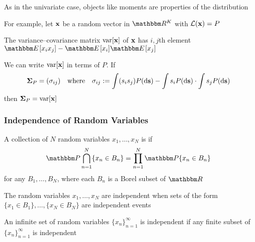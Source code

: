 \begin{frame}
    
    \vspace{2em}
    As in the univariate case, objects like moments are properties
    of the distribution

    \vspace{1em}
    For example, let ${\mathbf x}$ be a random vector in $\RR^K$
    with $\mathcal L({\mathbf x}) = P$
    
    The variance--covariance matrix $\operatorname{var} [{\mathbf x}]$ of
    ${\mathbf x}$ has $i,j$th element $\EE [x_i x_j] - \EE[x_i]\EE[x_j]$
    
    We can
    write $\operatorname{var} [{\mathbf x}]$ in terms of $P$. If
    \begin{equation*}
        \label{eq:vcd2}
        {\boldsymbol \Sigma}_P = (\sigma_{ij}) 
        \quad \text{where} \quad
        \sigma_{ij} := \int (s_i s_j) P(\mathop{}\!\mathrm{d} {\mathbf s}) 
            - \int s_i P(\mathop{}\!\mathrm{d} {\mathbf s}) \cdot \int s_j P(\mathop{}\!\mathrm{d} {\mathbf s})
    \end{equation*}
    then ${\boldsymbol \Sigma}_P = \operatorname{var}[{\mathbf x}]$
    
\end{frame}

\begin{frame}\frametitle{Independence of Random Variables}

    \vspace{2em}
    A collection of $N$ random variables $x_1, \ldots, x_N$ is  if
    \begin{equation}
        \label{eq:bcap}
        \PP \bigcap_{n=1}^N \{x_n \in B_n\}
        = \prod_{n=1}^N \PP\{x_n \in B_n\} 
    \end{equation}
    for any $B_1, \ldots, B_N$, where each $B_n$ is a Borel subset of $\RR$
    
    \vspace{1em}
    The random variables $x_1, \ldots, x_N$ are
    independent when sets of the form $\{x_1 \in B_1\}, \ldots, \{x_N
    \in B_N\}$ are independent events
    
    An infinite set of random variables $\{x_n\}_{n=1}^{\infty}$ is
    independent if any finite subset of $\{x_n\}_{n=1}^{\infty}$ is independent
    
\end{frame}

